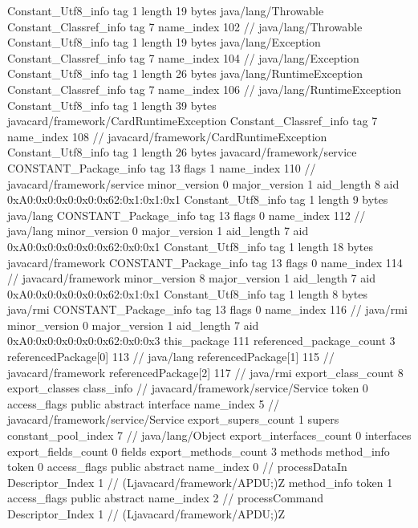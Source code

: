 {{{		}
		Constant_Utf8_info {
			tag	1
			length	19
			bytes	java/lang/Throwable
		}
		Constant_Classref_info {
			tag	7
			name_index	102		// java/lang/Throwable
		}
		Constant_Utf8_info {
			tag	1
			length	19
			bytes	java/lang/Exception
		}
		Constant_Classref_info {
			tag	7
			name_index	104		// java/lang/Exception
		}
		Constant_Utf8_info {
			tag	1
			length	26
			bytes	java/lang/RuntimeException
		}
		Constant_Classref_info {
			tag	7
			name_index	106		// java/lang/RuntimeException
		}
		Constant_Utf8_info {
			tag	1
			length	39
			bytes	javacard/framework/CardRuntimeException
		}
		Constant_Classref_info {
			tag	7
			name_index	108		// javacard/framework/CardRuntimeException
		}
		Constant_Utf8_info {
			tag	1
			length	26
			bytes	javacard/framework/service
		}
		CONSTANT_Package_info {
			tag	13
			flags	1
			name_index	110		// javacard/framework/service
			minor_version	0
			major_version	1
			aid_length	8
			aid	0xA0:0x0:0x0:0x0:0x62:0x1:0x1:0x1
		}
		Constant_Utf8_info {
			tag	1
			length	9
			bytes	java/lang
		}
		CONSTANT_Package_info {
			tag	13
			flags	0
			name_index	112		// java/lang
			minor_version	0
			major_version	1
			aid_length	7
			aid	0xA0:0x0:0x0:0x0:0x62:0x0:0x1
		}
		Constant_Utf8_info {
			tag	1
			length	18
			bytes	javacard/framework
		}
		CONSTANT_Package_info {
			tag	13
			flags	0
			name_index	114		// javacard/framework
			minor_version	8
			major_version	1
			aid_length	7
			aid	0xA0:0x0:0x0:0x0:0x62:0x1:0x1
		}
		Constant_Utf8_info {
			tag	1
			length	8
			bytes	java/rmi
		}
		CONSTANT_Package_info {
			tag	13
			flags	0
			name_index	116		// java/rmi
			minor_version	0
			major_version	1
			aid_length	7
			aid	0xA0:0x0:0x0:0x0:0x62:0x0:0x3
		}
	}
	this_package	111
	referenced_package_count	3
	referencedPackage[0]	113		// java/lang
	referencedPackage[1]	115		// javacard/framework
	referencedPackage[2]	117		// java/rmi
	export_class_count	8
	export_classes {
		class_info {		// javacard/framework/service/Service
			token	0
			access_flags	public abstract interface
			name_index	5		// javacard/framework/service/Service
			export_supers_count	1
			supers {
				constant_pool_index	7		// java/lang/Object
			}
			export_interfaces_count	0
			interfaces {
			}
			export_fields_count	0
			fields {
			}
			export_methods_count	3
			methods {
				method_info {
					token	0
					access_flags	public abstract
					name_index	0		// processDataIn
					Descriptor_Index	1		// (Ljavacard/framework/APDU;)Z
				}
				method_info {
					token	1
					access_flags	public abstract
					name_index	2		// processCommand
					Descriptor_Index	1		// (Ljavacard/framework/APDU;)Z
}}}}}
